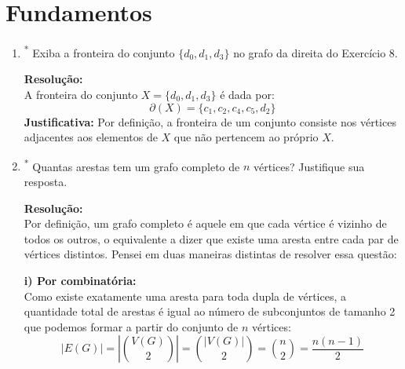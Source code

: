 \section{Fundamentos} 

\begin{enumerate}[label=\textbf{\arabic*.}, ref=\arabic*]
    \item\textsuperscript{*} Exiba a fronteira do conjunto $\{d_{0},d_{1},d_{3}\}$ no grafo da direita do Exercício 8. 

    \noindent \textbf{Resolução:} \\
    A fronteira do conjunto $X = \{d_0, d_1, d_3\}$ é dada por:
    \[
    \partial(X) = \{c_1, c_2, c_4, c_5, d_2\}
    \]
    \textbf{Justificativa:} Por definição, a fronteira de um conjunto consiste nos vértices adjacentes aos elementos de $X$ que não pertencem ao próprio $X$.
    
    \item\textsuperscript{*} Quantas arestas tem um grafo completo de $n$ vértices? Justifique sua resposta. 
    
    \noindent \textbf{Resolução:}\\
    Por definição, um grafo completo é aquele em que cada vértice é vizinho de todos os outros, o equivalente a dizer que existe uma aresta entre cada par de vértices distintos. Pensei em duas maneiras distintas de resolver essa questão:
    
    \vspace{0.3cm}
    \noindent \textbf{i) Por combinatória:}\\
    Como existe exatamente uma aresta para toda dupla de vértices, a quantidade total de arestas é igual ao número de subconjuntos de tamanho 2 que podemos formar a partir do conjunto de $n$ vértices:
    \[
    |E(G)| = \left| \binom{V(G)}{2} \right| = \binom{|V(G)|}{2} = \binom{n}{2} = \frac{n(n-1)}{2}
    \]
    

\end{enumerate}
